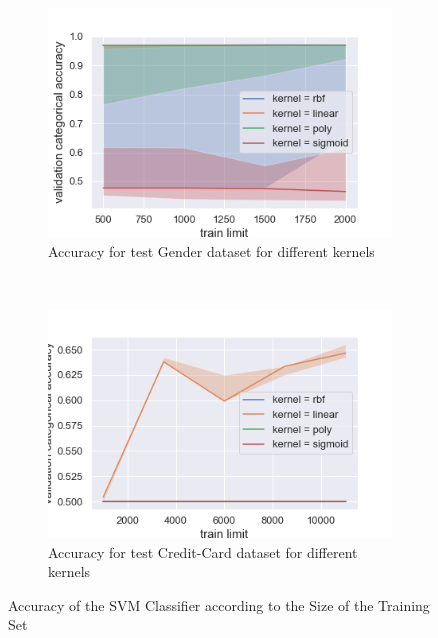 \documentclass[10pt]{article}
\begin{document}
		\paragraph*{}
			\begin{figure}[h]
				\centering
				\begin{subfigure}[]{0.45\columnwidth}
					\centering
					\includegraphics[width=\linewidth]{../graphics/svm_gender_train_limit_score_type_kernel.png}
					\caption{Accuracy for test Gender dataset for different kernels}
					\label{svm:g_train_limit}
				\end{subfigure}
				~
				\begin{subfigure}[]{0.45\columnwidth}
					\centering
					\includegraphics[width=\linewidth]{../graphics/svm_creditcard_train_limit_score_type_kernel.png}
					\caption{Accuracy for test Credit-Card dataset for different kernels}
					\label{svm:cc_train_limit}
				\end{subfigure}
				\caption{Accuracy of the SVM Classifier according to the Size of the Training Set}
				\label{svm:train_limit}
			\end{figure}
\end{document}
